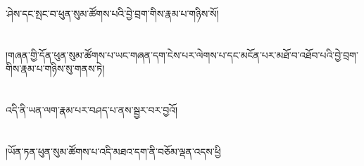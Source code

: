 ་ཤེས་དང་སྤང་བ་ཕུན་སུམ་ཚོགས་པའི་བྱེ་བྲག་གིས་རྣམ་པ་གཉིས་སོ།\chapter{ }།གཞན་གྱི་དོན་ཕུན་སུམ་ཚོགས་པ་ཡང་གཞན་དག་ངེས་པར་ལེགས་པ་དང་མངོན་པར་མཐོ་བ་འཐོབ་པའི་བྱེ་བྲག་གིས་རྣམ་པ་གཉིས་སུ་གནས་ཏེ།\chapter{ }འདི་ནི་ཡན་ལག་རྣམ་པར་བཤད་པ་ནས་སྦྱར་བར་བྱའོ།\chapter{ }།ཡོན་ཏན་ཕུན་སུམ་ཚོགས་པ་འདི་མཐའ་དག་ནི་བཅོམ་ལྡན་འདས་ཕྱི
